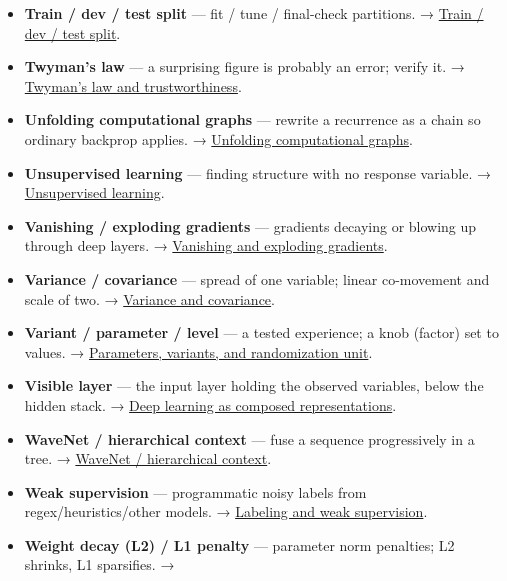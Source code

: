 \documentclass[
  10pt,
  letterpaper,
  onecolumn]{article}
\begin{document}
\begin{itemize}
  \textbf{tanh} --- S-shaped activation with output in
  \texttt{(−1,\ 1)}, centered near 0. →
  \protect\hyperlink{activation-function}{Activation function}.
\item
  \textbf{Train / dev / test split} --- fit / tune / final-check
  partitions. → \protect\hyperlink{train-dev-test-split}{Train / dev /
  test split}.
\item
  \textbf{Twyman's law} --- a surprising figure is probably an error;
  verify it. →
  \protect\hyperlink{twymans-law-and-trustworthiness}{Twyman's law and
  trustworthiness}.
\item
  \textbf{Unfolding computational graphs} --- rewrite a recurrence as a
  chain so ordinary backprop applies. →
  \protect\hyperlink{unfolding-computational-graphs}{Unfolding
  computational graphs}.
\item
  \textbf{Unsupervised learning} --- finding structure with no response
  variable. → \protect\hyperlink{unsupervised-learning}{Unsupervised
  learning}.
\item
  \textbf{Vanishing / exploding gradients} --- gradients decaying or
  blowing up through deep layers. →
  \protect\hyperlink{vanishing-and-exploding-gradients}{Vanishing and
  exploding gradients}.
\item
  \textbf{Variance / covariance} --- spread of one variable; linear
  co-movement and scale of two. →
  \protect\hyperlink{variance-and-covariance}{Variance and covariance}.
\item
  \textbf{Variant / parameter / level} --- a tested experience; a knob
  (factor) set to values. →
  \protect\hyperlink{parameters-variants-and-randomization-unit}{Parameters,
  variants, and randomization unit}.
\item
  \textbf{Visible layer} --- the input layer holding the observed
  variables, below the hidden stack. →
  \protect\hyperlink{deep-learning-as-composed-representations}{Deep
  learning as composed representations}.
\item
  \textbf{WaveNet / hierarchical context} --- fuse a sequence
  progressively in a tree. →
  \protect\hyperlink{wavenet-hierarchical-context}{WaveNet /
  hierarchical context}.
\item
  \textbf{Weak supervision} --- programmatic noisy labels from
  regex/heuristics/other models. →
  \protect\hyperlink{labeling-and-weak-supervision}{Labeling and weak
  supervision}.
\item
  \textbf{Weight decay (L2) / L1 penalty} --- parameter norm penalties;
  L2 shrinks, L1 sparsifies. →

\end{itemize}
\end{document}
